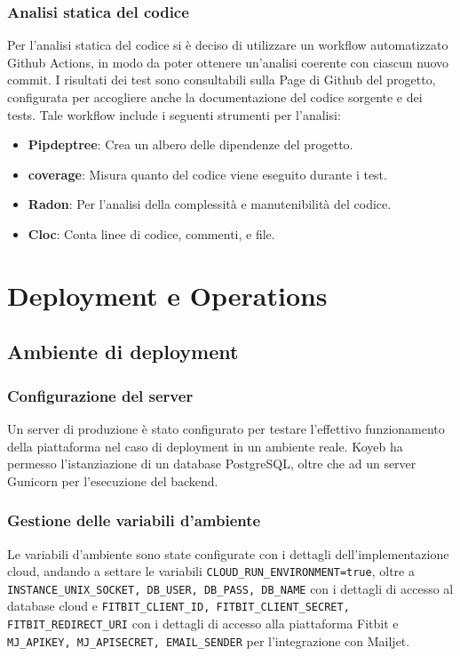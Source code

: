 \documentclass[12pt,a4paper,oneside]{report}
\begin{document}
\subsection{Analisi statica del codice}
Per l'analisi statica del codice si è deciso di utilizzare un workflow automatizzato Github Actions, in modo da poter ottenere un'analisi coerente con ciascun nuovo commit.
I risultati dei test sono consultabili sulla Page di Github del progetto, configurata per accogliere anche la documentazione del codice sorgente e dei tests.
Tale workflow include i seguenti strumenti per l'analisi:
\begin{itemize}
    \item \textbf{Pipdeptree}: Crea un albero delle dipendenze del progetto.

    \item \textbf{coverage}: Misura quanto del codice viene eseguito durante i test.

    \item \textbf{Radon}: Per l’analisi della complessità e manutenibilità del codice.

    \item \textbf{Cloc}: Conta linee di codice, commenti, e file.
\end{itemize}

\chapter{Deployment e Operations}
\section{Ambiente di deployment}
\subsection{Configurazione del server}
Un server di produzione è stato configurato per testare l'effettivo funzionamento della piattaforma nel caso di deployment in un ambiente reale.
Koyeb \cite{koyeb} ha permesso l'istanziazione di un database PostgreSQL, oltre che ad un server Gunicorn per l'esecuzione del backend.
\subsection{Gestione delle variabili d'ambiente}\sloppy
Le variabili d'ambiente sono state configurate con i dettagli dell'implementazione cloud, andando a settare le variabili \texttt{CLOUD\_RUN\_ENVIRONMENT=true}, oltre a \texttt{INSTANCE\_UNIX\_SOCKET, DB\_USER, DB\_PASS, DB\_NAME}
con i dettagli di accesso al database cloud e \texttt{FITBIT\_CLIENT\_ID, FITBIT\_CLIENT\_SECRET, FITBIT\_REDIRECT\_URI} con i dettagli di accesso alla piattaforma Fitbit e \texttt{MJ\_APIKEY, MJ\_APISECRET, EMAIL\_SENDER} per l'integrazione con Mailjet.
\end{document}
